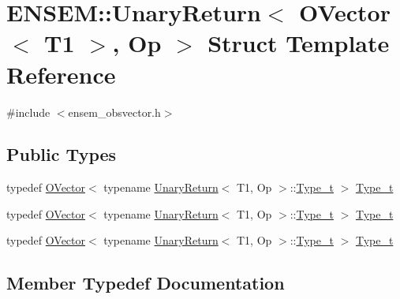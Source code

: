 \hypertarget{structENSEM_1_1UnaryReturn_3_01OVector_3_01T1_01_4_00_01Op_01_4}{}\section{E\+N\+S\+EM\+:\+:Unary\+Return$<$ O\+Vector$<$ T1 $>$, Op $>$ Struct Template Reference}
\label{structENSEM_1_1UnaryReturn_3_01OVector_3_01T1_01_4_00_01Op_01_4}


{\ttfamily \#include $<$ensem\+\_\+obsvector.\+h$>$}

\subsection*{Public Types}
\begin{DoxyCompactItemize}
\item 
typedef \mbox{\hyperlink{classENSEM_1_1OVector}{O\+Vector}}$<$ typename \mbox{\hyperlink{structENSEM_1_1UnaryReturn}{Unary\+Return}}$<$ T1, Op $>$\+::\mbox{\hyperlink{structENSEM_1_1UnaryReturn_3_01OVector_3_01T1_01_4_00_01Op_01_4_a271ecea83fd5cd6b106bd500ff150660}{Type\+\_\+t}} $>$ \mbox{\hyperlink{structENSEM_1_1UnaryReturn_3_01OVector_3_01T1_01_4_00_01Op_01_4_a271ecea83fd5cd6b106bd500ff150660}{Type\+\_\+t}}
\item 
typedef \mbox{\hyperlink{classENSEM_1_1OVector}{O\+Vector}}$<$ typename \mbox{\hyperlink{structENSEM_1_1UnaryReturn}{Unary\+Return}}$<$ T1, Op $>$\+::\mbox{\hyperlink{structENSEM_1_1UnaryReturn_3_01OVector_3_01T1_01_4_00_01Op_01_4_a271ecea83fd5cd6b106bd500ff150660}{Type\+\_\+t}} $>$ \mbox{\hyperlink{structENSEM_1_1UnaryReturn_3_01OVector_3_01T1_01_4_00_01Op_01_4_a271ecea83fd5cd6b106bd500ff150660}{Type\+\_\+t}}
\item 
typedef \mbox{\hyperlink{classENSEM_1_1OVector}{O\+Vector}}$<$ typename \mbox{\hyperlink{structENSEM_1_1UnaryReturn}{Unary\+Return}}$<$ T1, Op $>$\+::\mbox{\hyperlink{structENSEM_1_1UnaryReturn_3_01OVector_3_01T1_01_4_00_01Op_01_4_a271ecea83fd5cd6b106bd500ff150660}{Type\+\_\+t}} $>$ \mbox{\hyperlink{structENSEM_1_1UnaryReturn_3_01OVector_3_01T1_01_4_00_01Op_01_4_a271ecea83fd5cd6b106bd500ff150660}{Type\+\_\+t}}
\end{DoxyCompactItemize}


\subsection{Member Typedef Documentation}
\mbox{\label{structENSEM_1_1UnaryReturn_3_01OVector_3_01T1_01_4_00_01Op_01_4_a271ecea83fd5cd6b106bd500ff150660}} 
